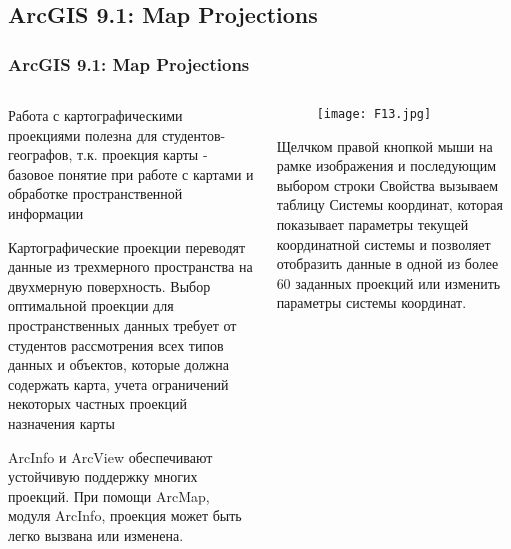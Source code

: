 \documentclass[pdflatex,compress,8pt,
	xcolor={dvipsnames,dvipsnames,svgnames,x11names,table},
	hyperref={	 
	pdfauthor={Lemenkova Polina}, 
	pdfsubject={Preentation}, 
	pdfcreator={Lemenkova Polina}, 
	pdfproducer={Lemenkova Polina}, 
	colorlinks=true,
	linkcolor=Red3, 
	citecolor=NavyBlue, 
	urlcolor = NavyBlue, 
	breaklinks = true}]{beamer}
\begin{document}
\subsection{ArcGIS 9.1: Map Projections}
\begin{frame}\frametitle{ArcGIS 9.1: Map Projections}

\begin{minipage}[0.4\textheight]{\textwidth}
		\begin{columns}[T]
			\begin{column}{0.5\textwidth}

\small{\begin{alertblock}{}
Работа с картографическими проекциями полезна для студентов-географов, т.к. проекция карты - базовое понятие при работе с картами и обработке пространственной информации
\end{alertblock}

\begin{block}{}
Картографические проекции переводят данные из трехмерного пространства  на двухмерную поверхность. Выбор оптимальной проекции для пространственных данных требует от студентов рассмотрения всех типов данных и объектов, которые должна содержать карта, учета ограничений некоторых частных проекций назначения карты
\end{block}
}

\begin{alertblock}{}
ArcInfo и ArcView обеспечивают устойчивую поддержку многих проекций. При помощи ArcMap, модуля ArcInfo,
проекция может быть легко вызвана или изменена. 
\end{alertblock}

			\end{column}
			\begin{column}{0.5\textwidth}
				\begin{figure}[H]
					\centering
					\texttt{[image: F13.jpg]}
				\end{figure}
\begin{block}{}
Щелчком правой кнопкой мыши на рамке изображения и последующим выбором строки Свойства вызываем таблицу Системы координат, которая показывает параметры текущей  координатной системы  и позволяет отобразить данные  в одной из более 60 заданных проекций или изменить параметры системы координат.
\end{block}
			\end{column}
		\end{columns}
	\end{minipage}
\end{frame}
\end{document}
